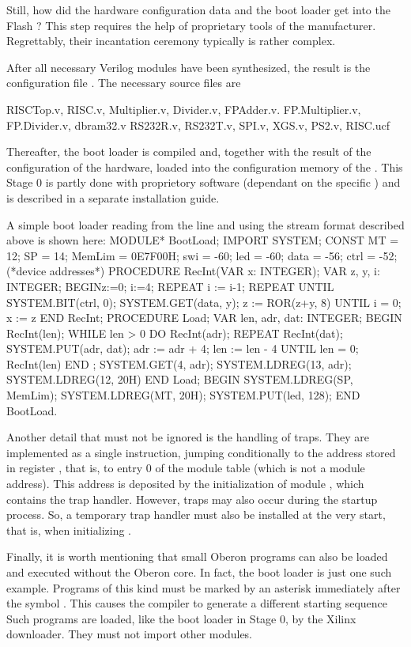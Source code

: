 Still, how did the hardware configuration data and the boot loader get into the Flash ? This step requires the help of proprietary tools of the  manufacturer. Regrettably, their incantation ceremony typically is rather complex.

After all necessary Verilog modules have been synthesized, the result is the configuration file . The necessary source files are

RISCTop.v, RISC.v, Multiplier.v, Divider.v, FPAdder.v. FP.Multiplier.v, FP.Divider.v, dbram32.v RS232R.v, RS232T.v, SPI.v, XGS.v, PS2.v, RISC.ucf

Thereafter, the boot loader is compiled and, together with the result of the configuration of the \RISC hardware, loaded into the configuration memory of the . This Stage 0 is partly done with proprietory software (dependant on the specific ) and is described in a separate installation guide.


A simple boot loader reading from the  line and using the stream format described above is shown here:
\begintt
MODULE* BootLoad;
IMPORT SYSTEM;
CONST MT = 12; SP = 14; MemLim = 0E7F00H;
swi = -60; led = -60; data = -56; ctrl = -52; (*device addresses*)
PROCEDURE RecInt(VAR x: INTEGER); VAR z, y, i: INTEGER;
BEGINz:=0; i:=4; REPEAT i := i-1;
REPEAT UNTIL SYSTEM.BIT(ctrl, 0);
SYSTEM.GET(data, y); z := ROR(z+y, 8) UNTIL i = 0;
x := z
END RecInt;
PROCEDURE Load;
VAR len, adr, dat: INTEGER;
BEGIN RecInt(len); WHILE len > 0 DO
RecInt(adr);
REPEAT RecInt(dat); SYSTEM.PUT(adr, dat); adr := adr + 4; len := len - 4 UNTIL len = 0; RecInt(len)
END ;
SYSTEM.GET(4, adr); SYSTEM.LDREG(13, adr); SYSTEM.LDREG(12, 20H) END Load;
BEGIN SYSTEM.LDREG(SP, MemLim); SYSTEM.LDREG(MT, 20H); SYSTEM.PUT(led, 128); END BootLoad.
\endtt

\noindent Another detail that must not be ignored is the handling of traps. They are implemented as a single  instruction, jumping conditionally to the address stored in register , that is, to entry 0 of the module table (which is not a module address). This address is deposited by the initialization of module , which contains the trap handler. However, traps may also occur during the startup process. So, a temporary trap handler must also be installed at the very start, that is, when initializing .

Finally, it is worth mentioning that small Oberon programs can also be loaded and executed without the Oberon core. In fact, the boot loader is just one such example. Programs of this kind must be marked by an asterisk immediately after the symbol . This causes the compiler to generate a different starting sequence Such programs are loaded, like the boot loader in Stage 0, by the Xilinx downloader. They must not import other modules.

